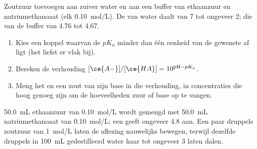 \begin{omfigure}

{\small Zoutzuur toevoegen aan zuiver water en aan een buffer van
ethaanzuur en natriumethanoaat (elk \qty{0.10}{mol/L}). De  van water
daalt van 7 tot ongeveer 2; die van de buffer van 4.76 tot 4.67.}
\end{omfigure}

\begin{method}\label{met:g12:buffers-predominance:prepare}
\begin{enumerate}
  \item Kies een koppel waarvan de $pK_a$ minder dan één eenheid van de
        gewenste  af ligt (het liefst er vlak bij).
  \item Bereken de verhouding $[\ce{A-}]/[\ce{HA}] = 10^{\mathrm{pH} - pK_a}$.
  \item Meng het  en een zout van zijn base in die verhouding,
        in concentraties die hoog genoeg zijn om de hoeveelheden zuur of
        base op te vangen.
\end{enumerate}
\end{method}

\begin{inthelab}
\qty{50.0}{mL} ethaanzuur van \qty{0.10}{mol/L} wordt gemengd met
\qty{50.0}{mL} natriumethanoaat van \qty{0.10}{mol/L}; een  geeft
ongeveer 4.8 aan. Een paar druppels zoutzuur van \qty{1}{mol/L} laten de
aflezing nauwelijks bewegen, terwijl dezelfde druppels in \qty{100}{mL}
gedestilleerd water haar tot ongeveer 3 laten dalen.
\end{inthelab}

